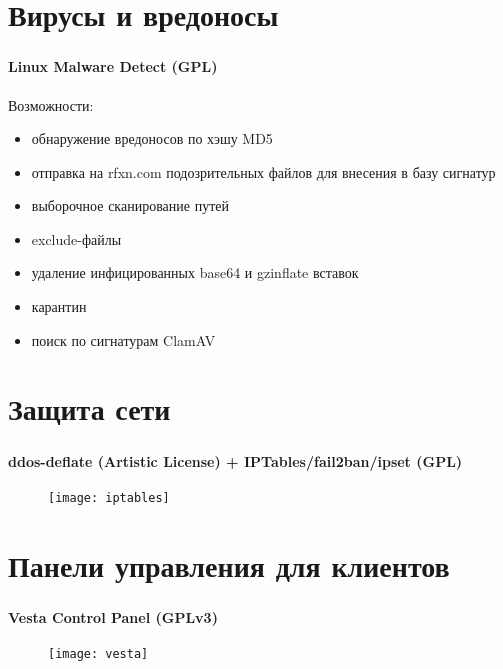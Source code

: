 
\section{Вирусы и вредоносы}

\begin{frame}
\frametitle{\insertsection}
\framesubtitle{Linux Malware Detect (GPL)}
Возможности:
\begin{itemize}
	\item обнаружение вредоносов по хэшу MD5
	\item отправка на rfxn.com подозрительных файлов для внесения в базу сигнатур
	\item выборочное сканирование путей
	\item exclude-файлы
	\item удаление инфицированных base64 и gzinflate вставок
	\item карантин
	\item поиск по сигнатурам ClamAV
\end{itemize}
\end{frame}


\section{Защита сети}

\begin{frame}
\frametitle{\insertsection}
\framesubtitle{ddos-deflate (Artistic License) + IPTables/fail2ban/ipset (GPL)}
\begin{figure}[h]
	\begin{center}
		\texttt{[image: iptables]}
	\end{center}
\end{figure}
\end{frame}


\section{Панели управления для клиентов}

\begin{frame}
\frametitle{\insertsection}
\framesubtitle{Vesta Control Panel (GPLv3)}
\begin{figure}[h]
	\begin{center}
		\texttt{[image: vesta]}
	\end{center}
\end{figure}
\end{frame}

